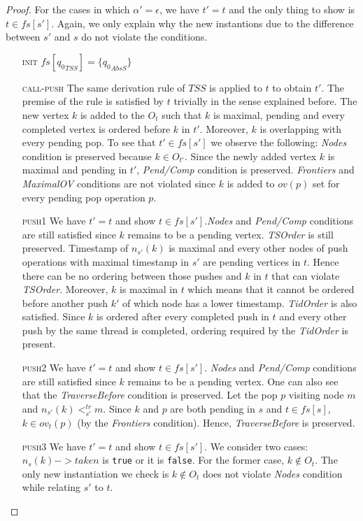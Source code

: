\documentclass{article}
\begin{document}
\begin{proof}
For the cases in which $\alpha' = \epsilon$, we have $t'=t$ and the only thing to show is $t \in fs[s']$. Again, we only explain why the new instantions due to the difference between $s'$ and $s$ do not violate the conditions.
\begin{itemize}
\item[\textsc{init}] $fs[{q_0}_{TSS}] =\{{q_0}_{AbsS}\}$
\item[\textsc{call-push}] The same derivation rule of $TSS$ is applied to $t$  to obtain $t'$. The premise of the rule is satisfied by $t$ trivially in the sense explained before. The new vertex $k$ is added to the $O_t$ such that $k$ is maximal, pending and every completed vertex is ordered before $k$ in $t'$. Moreover, $k$ is overlapping with every pending pop. To see that $t' \in fs[s']$ we observe the following: \emph{Nodes} condition is preserved because $k \in O_{t'}$. Since the newly added vertex $k$ is maximal and pending in $t'$, \emph{Pend/Comp} condition is preserved. \emph{Frontiers} and \emph{MaximalOV} conditions are not violated since $k$ is added to $ov(p)$ set for every pending pop operation $p$. 
\item[\textsc{push1}] We have $t' = t$ and show $t \in fs[s']$.\emph{Nodes} and \emph{Pend/Comp} conditions are still satisfied since $k$ remains to be a pending vertex. \emph{TSOrder} is still preserved. Timestamp of $n_{s'}(k)$ is maximal and every other nodes of push operations with maximal timestamp in $s'$ are pending vertices in $t$. Hence there can be no ordering between those pushes and $k$ in $t$ that can violate \emph{TSOrder}. Moreover, $k$ is maximal in $t$ which means that it cannot be ordered before another push $k'$ of which node has a lower timestamp. \emph{TidOrder} is also satisfied. Since $k$ is ordered after every completed push in $t$ and every other push by the same thread is completed, ordering required by the \emph{TidOrder} is present.
\item[\textsc{push2}] We have $t' = t$ and show $t \in fs[s']$. \emph{Nodes} and \emph{Pend/Comp} conditions are still satisfied since $k$ remains to be a pending vertex. One can also see that the \emph{TraverseBefore} condition is preserved. Let the pop $p$ visiting node $m$ and $n_{s'}(k) <^{tr}_{s'} m$. Since $k$ and $p$ are both pending in $s$ and $t \in fs[s]$, $k \in ov_t(p)$ (by the \emph{Frontiers} condition). Hence, \emph{TraverseBefore} is preserved. 
\item[\textsc{push3}] We have $t' = t$ and show $t \in fs[s']$. We consider two cases: $n_s(k)->taken$ is \texttt{true} or it is \texttt{false}. For the former case, $k \notin O_t$. The only new instantiation we check is $k \notin O_t$ does not violate \emph{Nodes} condition while relating $s'$ to $t$. 


\end{itemize}
\end{proof}
\end{document}
